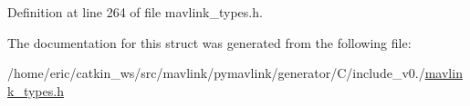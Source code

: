 Definition at line 264 of file mavlink\+\_\+types.\+h.



The documentation for this struct was generated from the following file\+:\begin{DoxyCompactItemize}
\item 
/home/eric/catkin\+\_\+ws/src/mavlink/pymavlink/generator/\+C/include\+\_\+v0./\mbox{\hyperlink{include__v0_89_2mavlink__types_8h}{mavlink\+\_\+types.\+h}}\end{DoxyCompactItemize}
